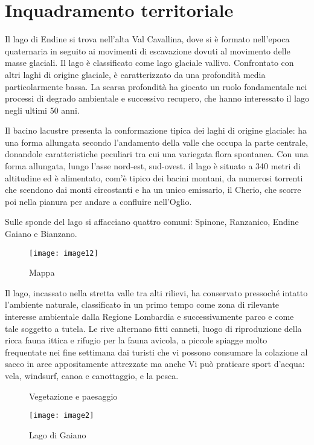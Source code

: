 \section{Inquadramento territoriale}

Il lago di Endine si trova nell'alta Val Cavallina, dove si è formato nell'epoca quaternaria in seguito ai movimenti di escavazione dovuti al movimento delle masse glaciali. 
Il lago è classificato come lago glaciale vallivo. Confrontato con altri laghi di origine glaciale, è caratterizzato da una profondità media particolarmente bassa.
La scarsa profondità ha giocato un ruolo fondamentale nei processi di degrado ambientale e successivo recupero, che hanno interessato il lago negli ultimi 50 anni. 

Il bacino lacustre presenta la conformazione tipica dei laghi di origine glaciale: ha una forma allungata secondo l’andamento della valle che occupa la parte centrale, donandole caratteristiche peculiari tra cui una variegata flora spontanea. 
Con una forma allungata, lungo l’asse nord-est, sud-ovest. 
il lago è situato a 340 metri di altitudine ed è alimentato, com'è tipico dei bacini montani, da numerosi torrenti che scendono dai monti circostanti e ha un unico emissario, il Cherio, che scorre poi nella pianura per andare a confluire nell'Oglio.

Sulle sponde del lago si affacciano quattro comuni: Spinone, Ranzanico, Endine Gaiano e Bianzano.

\begin{figure}[H]
	\centering
	\texttt{[image: image12]}
	\caption{Mappa}
	\label{fig:mesh1}
\end{figure}

Il lago, incassato nella stretta valle tra alti rilievi, ha conservato pressoché intatto l'ambiente naturale, classificato in un primo tempo come zona di rilevante interesse ambientale dalla Regione Lombardia e successivamente parco e come tale soggetto a tutela.
Le rive alternano fitti canneti, luogo di riproduzione della ricca fauna ittica e rifugio per la fauna avicola, a piccole spiagge molto frequentate nei fine settimana dai turisti che vi possono consumare la colazione al sacco in aree appositamente attrezzate ma anche Vi può praticare  sport d'acqua: vela, windsurf, canoa e canottaggio, e la pesca.

\begin{figure}[H]
	\captionsetup[subfloat]{farskip=2pt,captionskip=8pt}
	\centering
	\hspace{1cm}

	\caption{Vegetazione e paesaggio}
	\label{fig:imagesizes}
\end{figure}
\begin{figure}[H]
	\centering
	\texttt{[image: image2]}
	\caption{Lago di Gaiano}
	\label{fig:mesh1}
\end{figure}


